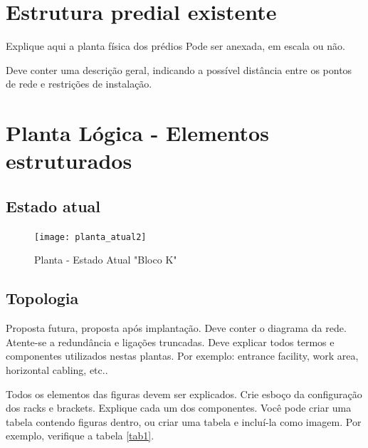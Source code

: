 \documentclass[	DIV=calc,%
							paper=a4,%
							fontsize=12pt,%
							onecolumn]{scrartcl}	 					%
\begin{document}
\section{Estrutura predial existente}

Explique aqui a planta física dos prédios
Pode ser anexada, em escala ou não.

Deve conter uma descrição geral, indicando a possível distância entre os pontos de rede e restrições de instalação.

\section{Planta Lógica - Elementos estruturados}

\subsection{Estado atual}
\begin{figure}
	\centering
	\caption{Planta - Estado Atual "Bloco K"}
	\texttt{[image: planta\_atual2]}
\end{figure}

\subsection{Topologia}
Proposta futura, proposta após implantação.
Deve conter o diagrama da rede. Atente-se a redundância  e ligações truncadas.
Deve explicar todos termos e componentes utilizados nestas plantas. Por exemplo: entrance facility, work area, horizontal cabling, etc..

Todos os elementos das figuras devem ser explicados. 
Crie esboço da configuração dos racks e brackets. Explique cada um dos componentes. Você pode criar uma tabela contendo figuras dentro, ou criar uma tabela e incluí-la como imagem. Por exemplo, verifique a tabela \ref{tab1}.


\end{document}
